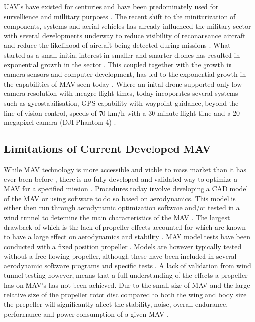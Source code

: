 UAV's have existed for centuries and have been predominately used for survellience and millitary purposes \cite{Aleksander2018}. The recent shift to the miniturization of components, systems and aerial vehicles has already influenced the military sector with several developments underway to reduce visibility of reconansance aircraft and reduce the likelihood of aircraft being detected during missions \cite{Aleksander2018} \cite{Mil2022} \cite{Greenwood2019} \cite{Saytov2022}. What started as a small initial interest in smaller and smarter drones has resulted in exponential growth in the sector \cite{NONAMI2007} \cite{Wang2019} . This coupled together with the growth in camera sensors and computer development, has led to the exponential growth in the capabilities of MAV seen today \cite{Yin2020} \cite{Jackson2016}. Where an inital drone supported only low camera resolution with meagre flight times, today incoporates several systems such as gyrostabilisation, GPS capability with waypoint guidance, beyond the line of vision control, speeds of 70 km/h with a 30 minute flight time and a 20 megapixel camera (DJI Phantom 4) \cite{Peppa2019}.\\


\subsection{Limitations of Current Developed MAV}
\label{subsec:Limitations}
While MAV technology is more accessible and viable to mass market than it has ever been before \cite{Jackson2016}, there is no fully developed and validated way to optimize a MAV for a specified mission \cite{Bronz2009} \cite{HASSANALIAN2019}. Procedures today involve developing a CAD model of the MAV or using software to do so based on aerodynamics. This model is either then run through aerodynamic optimization software and/or tested in a wind tunnel to detemine the main characteristics of the MAV \cite{Paulson2017}. The largest drawback of which is the lack of propeller effects accounted for which are known to have a large effect on aerodynamics and stability \cite{Harikumar2021} \cite{Chinwicharnam2013}. MAV model tests have been conducted with a fixed position propeller \cite{Shams2020b} \cite{Durai2014}. Models are however typically tested without a free-flowing propeller, although these have been included in several aerodynamic software programs and specific tests \cite{Aboelezz2020}. A lack of validation from wind tunnel testing however, means that a full understanding of the effects a propeller has on MAV's has not been achieved. Due to the small size of MAV and the large relative size of the propeller rotor disc compared to both the wing and body size the propeller will significantly affect the stability, noise, overall endurance, performance and power consumption of a given MAV \cite{Shams2020} \cite{Chen2022} \cite{Aminaei2018} \cite{Null2005} \cite{Parga2007} \cite{Harikumar2021} \cite{Jana2020}. 

